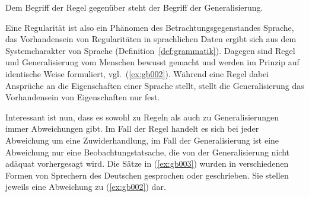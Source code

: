 Dem Begriff der Regel gegenüber steht der Begriff der Generalisierung.


Eine Regularität ist also ein Phänomen des Betrachtungsgegenstandes Sprache, das Vorhandensein von Regularitäten in sprachlichen Daten ergibt sich aus dem Systemcharakter von Sprache (Definition~\ref{def:grammatik}).
Dagegen sind Regel und Generalisierung vom Menschen bewusst gemacht und werden im Prinzip auf identische Weise formuliert, vgl.\ (\ref{ex:gb002}).
Während eine Regel dabei Ansprüche an die Eigenschaften einer Sprache stellt, stellt die Generalisierung das Vorhandensein von Eigenschaften nur fest.

Interessant ist nun, dass es sowohl zu Regeln als auch zu Generalisierungen immer Abweichungen gibt.
Im Fall der Regel handelt es sich bei jeder Abweichung um eine Zuwiderhandlung, im Fall der Generalisierung ist eine Abweichung nur eine Beobachtungstatsache, die von der Generalisierung nicht adäquat vorhergesagt wird.
Die Sätze in (\ref{ex:gb003}) wurden in verschiedenen Formen von Sprechern des Deutschen gesprochen oder geschrieben.
Sie stellen jeweils eine Abweichung zu (\ref{ex:gb002}) dar.

\begin{exe}
  \ex\label{ex:gb003}
  \begin{xlist}
  \end{xlist}
\end{exe}

